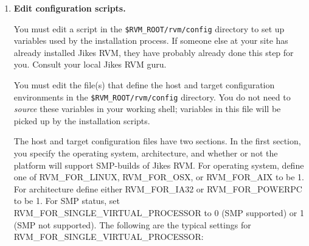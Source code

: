 \begin{enumerate}
\begin{verbatim}
setenv RVM_ROOT $HOME/rvmRoot       # <--define your working directory 
setenv RVM_BUILD $HOME/rvmBuild     # <--define your current build directory 
setenv PATH $RVM_ROOT/rvm/bin:$PATH
setenv RVM_HOST_CONFIG $RVM_ROOT/rvm/config/powerpc-ibm-aix4.3.3.0
setenv RVM_TARGET_CONFIG $RVM_ROOT/rvm/config/powerpc-ibm-aix4.3.3.0
\end{verbatim}

{\em Note:} You should define each of these environment variables as an
{\em absolute} path.  The builder template expansion process will crash
and burn if you use a \texttt{..} in these paths.

For a Linux-Intel environment, the exports
would be replaced with the following:

\begin{verbatim}
setenv RVM_HOST_CONFIG $RVM_ROOT/rvm/config/i686-pc-linux-gnu
setenv RVM_TARGET_CONFIG $RVM_ROOT/rvm/config/i686-pc-linux-gnu
\end{verbatim}

These two variables point to the same file when the type of system  
doing the build is the same as where you are going 
the execute Jikes RVM.  To cross build a system
(e.g., build on Linux/IA32 for an AIX\TMweb/PowerPC\TMweb
platform, see [ (sub-section~\Ref)]{cross-platform-building}.

\item {\bf Edit configuration scripts.}

You must edit a script in the \texttt{\$RVM\_ROOT/rvm/config}  directory to set 
up variables used by the installation process.  
If someone else at your site has already installed Jikes RVM, they have
probably already done this step for you.  Consult your local Jikes RVM guru.

You must edit the file(s) that define the host and target configuration
environments in the \texttt{\$RVM\_ROOT/rvm/config} directory.  
You do not need to {\em source} these variables in your working shell; 
variables in this file will be picked up by the installation scripts.  

The host and target configuration files have two sections.  In the
first section, you specify the operating system, architecture, and
whether or not the platform will support SMP-builds of Jikes RVM. 
For operating system, define one of RVM\_FOR\_LINUX, RVM\_FOR\_OSX,
or RVM\_FOR\_AIX 
to be 1.  For architecture define either
RVM\_FOR\_IA32 or RVM\_FOR\_POWERPC to be 1.  For SMP status, set
RVM\_\-FOR\_\-SIN\-GLE\_VIR\-TU\-AL\_PRO\-CES\-SOR to 0 (SMP supported) or 1 (SMP not
supported).  The following are the typical settings for
RVM\_\-FOR\_\-SIN\-GLE\_\-VIR\-TU\-AL\_\-PRO\-CES\-SOR:


\end{enumerate}
